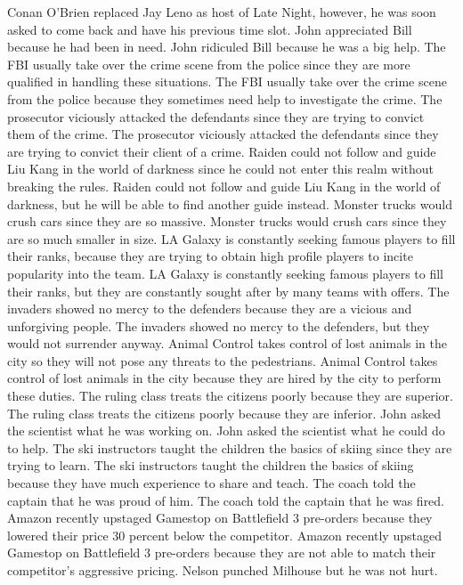 \documentclass{article}
\begin{document}
\begin{enumerate}
	Conan O'Brien replaced Jay Leno as host of Late Night, however, he was soon asked to come back and have his previous time slot.
	John appreciated Bill because he had been in need.
	John ridiculed Bill because he was a big help.
	The FBI usually take over the crime scene from the police since they are more qualified in handling these situations.
	The FBI usually take over the crime scene from the police because they sometimes need help to investigate the crime.
	The prosecutor viciously attacked the defendants since they are trying to convict them of the crime.
	The prosecutor viciously attacked the defendants since they are trying to convict their client of a crime.
	Raiden could not follow and guide Liu Kang in the world of darkness since he could not enter this realm without breaking the rules.
	Raiden could not follow and guide Liu Kang in the world of darkness, but he will be able to find another guide instead.
	Monster trucks would crush cars since they are so massive.
	Monster trucks would crush cars since they are so much smaller in size.
	LA Galaxy is constantly seeking famous players to fill their ranks, because they are trying to obtain high profile players to incite popularity into the team.
	LA Galaxy is constantly seeking famous players to fill their ranks, but they are constantly sought after by many teams with offers.
	The invaders showed no mercy to the defenders because they are a vicious and unforgiving people.
	The invaders showed no mercy to the defenders, but they would not surrender anyway.
	Animal Control takes control of lost animals in the city so they will not pose any threats to the pedestrians.
	Animal Control takes control of lost animals in the city because they are hired by the city to perform these duties.
	The ruling class treats the citizens poorly because they are superior.
	The ruling class treats the citizens poorly because they are inferior.
	John asked the scientist what he was working on.
	John asked the scientist what he could do to help.
	The ski instructors taught the children the basics of skiing since they are trying to learn.
	The ski instructors taught the children the basics of skiing because they have much experience to share and teach.
	The coach told the captain that he was proud of him.
	The coach told the captain that he was fired.
	Amazon recently upstaged Gamestop on Battlefield 3 pre-orders because they lowered their price 30 percent below the competitor.
	Amazon recently upstaged Gamestop on Battlefield 3 pre-orders because they are not able to match their competitor's aggressive pricing.
	Nelson punched Milhouse but he was not hurt.

\end{enumerate}
\end{document}
